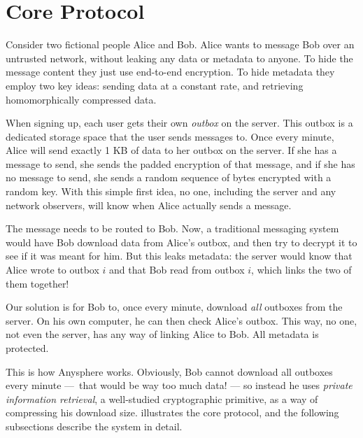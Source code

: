 \section{Core Protocol}
\label{sec:coreprotocol}

Consider two fictional people Alice and Bob. Alice wants to message Bob over an untrusted network, without leaking any data or metadata to anyone. To hide the message content they just use end-to-end encryption. To hide metadata they employ two key ideas: sending data at a constant rate, and retrieving homomorphically compressed data.

When signing up, each user gets their own \textit{outbox} on the server. This outbox is a dedicated storage space that the user sends messages to. Once every minute, Alice will send exactly 1 KB of data to her outbox on the server. If she has a message to send, she sends the padded encryption of that message, and if she has no message to send, she sends a random sequence of bytes encrypted with a random key. With this simple first idea, no one, including the server and any network observers, will know when Alice actually sends a message.

The message needs to be routed to Bob. Now, a traditional messaging system would have Bob download data from Alice's outbox, and then try to decrypt it to see if it was meant for him. But this leaks metadata: the server would know that Alice wrote to outbox $i$ and that Bob read from outbox $i$, which links the two of them together!

Our solution is for Bob to, once every minute, download \textit{all} outboxes from the server. On his own computer, he can then check Alice's outbox. This way, no one, not even the server, has any way of linking Alice to Bob. All metadata is protected.

This is how Anysphere works. Obviously, Bob cannot download all outboxes every minute — that would be way too much data! — so instead he uses \textit{private information retrieval}, a well-studied cryptographic primitive, as a way of compressing his download size.  illustrates the core protocol, and the following subsections describe the system in detail.

